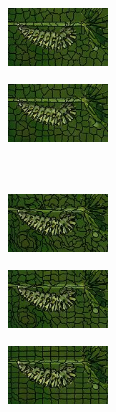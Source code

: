 \begin{figure}
\begin{subfigure}[b]{0.141\textwidth}
	\end{subfigure}
	\begin{subfigure}[b]{0.141\textwidth}
		\includegraphics[height=1.525cm]{pictures/compactness/bsds500/wp/score/5/cropped/wp_35028_contours}
	\end{subfigure}
	\begin{subfigure}[b]{0.141\textwidth}
		\includegraphics[height=1.525cm]{pictures/compactness/bsds500/wp/score/25/cropped/wp_35028_contours}
	\end{subfigure}\\
	\begin{subfigure}[b]{0.02\textwidth}
	\end{subfigure}
	\begin{subfigure}[b]{0.141\textwidth}
		\includegraphics[height=1.525cm]{pictures/compactness/bsds500/ergc/score/0/cropped/ergc_35028_contours}
	\end{subfigure}
	\begin{subfigure}[b]{0.141\textwidth}
		\includegraphics[height=1.525cm]{pictures/compactness/bsds500/ergc/score/5/cropped/ergc_35028_contours}
	\end{subfigure}
	\begin{subfigure}[b]{0.141\textwidth}
		\includegraphics[height=1.525cm]{pictures/compactness/bsds500/ergc/score/50/cropped/ergc_35028_contours}
	\end{subfigure}\\

\end{figure}
